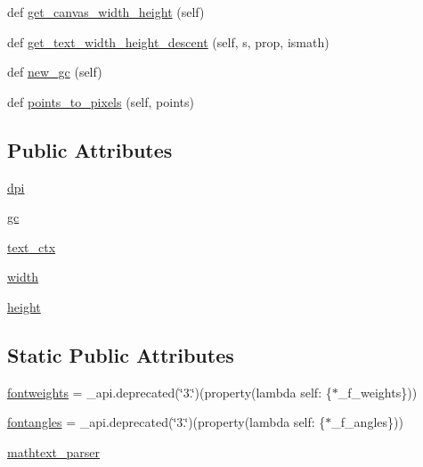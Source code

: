 \begin{DoxyCompactItemize}
def \hyperlink{classmatplotlib_1_1backends_1_1backend__cairo_1_1RendererCairo_aedf3fa1e3e5871360f9afd34cef803ed}{get\+\_\+canvas\+\_\+width\+\_\+height} (self)
\item 
def \hyperlink{classmatplotlib_1_1backends_1_1backend__cairo_1_1RendererCairo_af269325004bb402d9af8c3e21b1e6156}{get\+\_\+text\+\_\+width\+\_\+height\+\_\+descent} (self, s, prop, ismath)
\item 
def \hyperlink{classmatplotlib_1_1backends_1_1backend__cairo_1_1RendererCairo_a8f49a0a8cca3f7964ac49423c6c80224}{new\+\_\+gc} (self)
\item 
def \hyperlink{classmatplotlib_1_1backends_1_1backend__cairo_1_1RendererCairo_aba174214fa278e3d44d19f2c02df3f83}{points\+\_\+to\+\_\+pixels} (self, points)
\end{DoxyCompactItemize}
\subsection*{Public Attributes}
\begin{DoxyCompactItemize}
\item 
\hyperlink{classmatplotlib_1_1backends_1_1backend__cairo_1_1RendererCairo_a731be1d5833fc0e1e2ca270264b4f528}{dpi}
\item 
\hyperlink{classmatplotlib_1_1backends_1_1backend__cairo_1_1RendererCairo_ae780c7b41d12dd30c0ed2b7d6aba7f47}{gc}
\item 
\hyperlink{classmatplotlib_1_1backends_1_1backend__cairo_1_1RendererCairo_ab99c74700772e89f7c514cf7349b64bb}{text\+\_\+ctx}
\item 
\hyperlink{classmatplotlib_1_1backends_1_1backend__cairo_1_1RendererCairo_ae394da8b90802a9c233cfbdcf8974c0d}{width}
\item 
\hyperlink{classmatplotlib_1_1backends_1_1backend__cairo_1_1RendererCairo_a0d8ef711f54f5a5bad4a4e72fd583335}{height}
\end{DoxyCompactItemize}
\subsection*{Static Public Attributes}
\begin{DoxyCompactItemize}
\item 
\hyperlink{classmatplotlib_1_1backends_1_1backend__cairo_1_1RendererCairo_aff3b88f86c5cc431762d2e6a8444b051}{fontweights} = \+\_\+api.\+deprecated(\char`\"{}3.\char`\"{})(property(lambda self\+: \{$\ast$\+\_\+f\+\_\+weights\}))
\item 
\hyperlink{classmatplotlib_1_1backends_1_1backend__cairo_1_1RendererCairo_a6ccd0294e3252b41cac032aa5d8b85e8}{fontangles} = \+\_\+api.\+deprecated(\char`\"{}3.\char`\"{})(property(lambda self\+: \{$\ast$\+\_\+f\+\_\+angles\}))
\item 
\hyperlink{classmatplotlib_1_1backends_1_1backend__cairo_1_1RendererCairo_ac61f8ab3c57a42c1f1a48585bb9a855c}{mathtext\+\_\+parser}
\end{DoxyCompactItemize}


